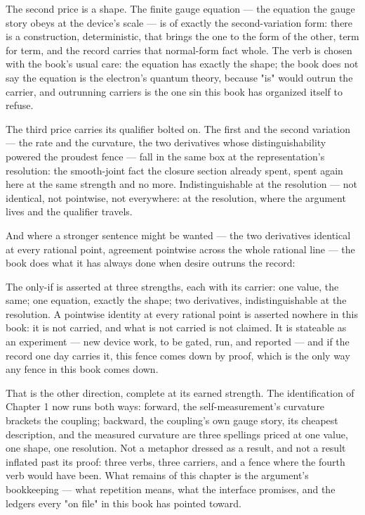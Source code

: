 The second price is a shape. The finite gauge equation --- the equation the gauge
story obeys at the device's scale --- is of exactly the second-variation form:
there is a construction, deterministic, that brings the one to the form of the
other, term for term, and the record carries that normal-form fact whole. The
verb is chosen with the book's usual care: the equation has exactly the shape;
the book does not say the equation is the electron's quantum theory, because
"is" would outrun the carrier, and outrunning carriers is the one sin this book
has organized itself to refuse.

The third price carries its qualifier bolted on. The first and the second
variation --- the rate and the curvature, the two derivatives whose
distinguishability powered the proudest fence --- fall in the same box at the
representation's resolution: the smooth-joint fact the closure section already
spent, spent again here at the same strength and no more. Indistinguishable at
the resolution --- not identical, not pointwise, not everywhere: at the
resolution, where the argument lives and the qualifier travels.

And where a stronger sentence might be wanted --- the two derivatives identical
at every rational point, agreement pointwise across the whole rational line ---
the book does what it has always done when desire outruns the record:

\begin{fence}
The only-if is asserted at three strengths, each with its carrier: one value,
the same; one equation, exactly the shape; two derivatives, indistinguishable
at the resolution. A pointwise identity at every rational point is asserted
nowhere in this book: it is not carried, and what is not carried is not
claimed. It is stateable as an experiment --- new device work, to be gated,
run, and reported --- and if the record one day carries it, this fence comes
down by proof, which is the only way any fence in this book comes down.
\end{fence}

That is the other direction, complete at its earned strength. The identification
of Chapter 1 now runs both ways: forward, the self-measurement's curvature
brackets the coupling; backward, the coupling's own gauge story, its cheapest
description, and the measured curvature are three spellings priced at one value,
one shape, one resolution. Not a metaphor dressed as a result, and not a result
inflated past its proof: three verbs, three carriers, and a fence where the
fourth verb would have been. What remains of this chapter is the argument's
bookkeeping --- what repetition means, what the interface promises, and the
ledgers every "on file" in this book has pointed toward.

